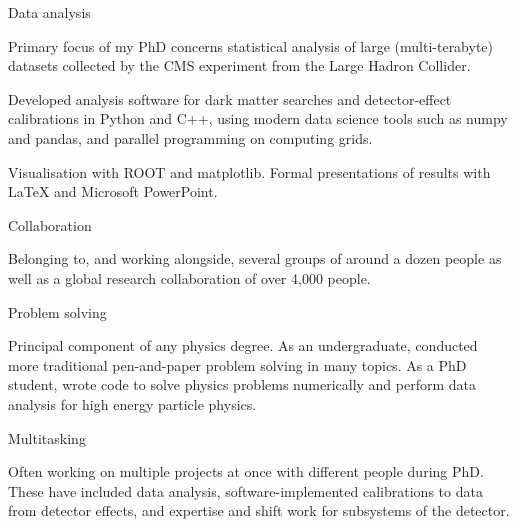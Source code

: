 

\begin{cventries}

    \cventry
    {} %
    {Data analysis} %
    {} %
    {} %
    {
      \begin{cvitems}
        \item {Primary focus of my PhD concerns statistical analysis of large (multi-terabyte) datasets collected by the CMS experiment from the Large Hadron Collider.}
        \item {Developed analysis software for dark matter searches and detector-effect calibrations in Python and C++, using modern data science tools such as numpy and pandas, and parallel programming on computing grids.}
        \item{Visualisation with ROOT and matplotlib. Formal presentations of results with LaTeX and Microsoft PowerPoint.}
        \end{cvitems}
    }

    \cventry
    {}
    {Collaboration}
    {}
    {}
    {
      \begin{cvitems}
        \item {Belonging to, and working alongside, several groups of around a dozen people as well as a global research collaboration of over 4,000 people.}
        \end{cvitems}
    }

    \cventry
    {}
    {Problem solving}
    {}
    {}
    {
      \begin{cvitems}
        \item {Principal component of any physics degree. As an undergraduate, conducted more traditional pen-and-paper problem solving in many topics. As a PhD student, wrote code to solve physics problems numerically and perform data analysis for high energy particle physics.}
        \end{cvitems}
    }

    \cventry
    {}
    {Multitasking}
    {}
    {}
    {
      \begin{cvitems}
        \item {Often working on multiple projects at once with different people during PhD. These have included data analysis, software-implemented calibrations to data from detector effects, and expertise and shift work for subsystems of the detector.}
        \end{cvitems}
    }



\end{cventries}
